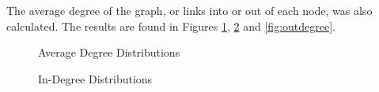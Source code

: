 The average degree of the graph, or links into or out of each node, was also calculated. The results are found in Figures \ref{fig:degree}, \ref{fig:indegree} and \ref{fig:outdegree}.

\begin{figure}[h!]
\centering
{}
\caption{Average Degree Distributions}
\label{fig:degree}
\end{figure}

\begin{figure}[h!]
\centering
{}
\caption{In-Degree Distributions}
\label{fig:indegree}
\end{figure}

